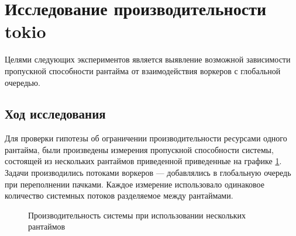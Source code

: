 
\section{Исследование производительности tokio}

Целями следующих экспериментов является выявление возможной зависимости пропускной способности рантайма от взаимодействия воркеров с глобальной очередью.

\subsection{Ход исследования}

Для проверки гипотезы об ограничении производительности ресурсами одного рантайма, были произведены измерения пропускной способности системы, состоящей из нескольких рантаймов приведенной приведенные на графике \ref{fig:tatlin:multi_rt:eval}. Задачи производились потоками воркеров --- добавлялись в глобальную очередь при переполнении пачками. Каждое измерение использовало одинаковое количество системных потоков разделяемое между рантаймами.

\begin{figure}[H]
    \begin{center}
    \end{center}

    \caption{Производительность системы при использовании нескольких рантаймов}
    \label{fig:tatlin:multi_rt:eval}
\end{figure}

